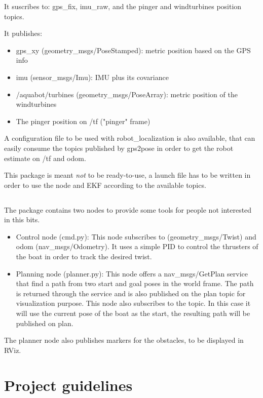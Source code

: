 \documentclass{ecnreport}
\begin{document}
It suscribes to: gps\_fix, imu\_raw, and the pinger and windturbines position topics.

It publishes:
\begin{itemize}
 \item gps\_xy (geometry\_msgs/PoseStamped): metric position based on the GPS info
\item imu (sensor\_msgs/Imu): IMU plus its covariance
\item /aquabot/turbines (geometry\_msgs/PoseArray): metric position of the windturbines
\item The pinger position on /tf ("pinger" frame)
\end{itemize}


A configuration file to be used with robot\_localization is also available, that can easily consume the topics published by gps2pose in order to get the robot estimate on /tf and odom.

This package is meant \emph{not} to be ready-to-use, a launch file has to be written in order to use the node and EKF according to the available topics.

\subsection{}

The  package contains two nodes to provide some tools for people not interested in this bits.

\begin{itemize}
 \item Control node (cmd.py): This node subscribes to  (geometry\_msgs/Twist) and odom (nav\_msgs/Odometry). It uses a simple PID to control the thrusters of the boat in order to track the desired twist.
 \item Planning node (planner.py): This node offers a nav\_msgs/GetPlan service that find a path from two start and goal poses in the world
frame. The path is returned through the service and is also published on the plan topic for visualization purpose. This node also subscribes
to the  topic. In this case it will use the current pose of the boat as the start, the resulting path will be published on plan.
\end{itemize}

The planner node also publishes markers for the obstacles, to be displayed in RViz.



\section{Project guidelines}
\end{document}
